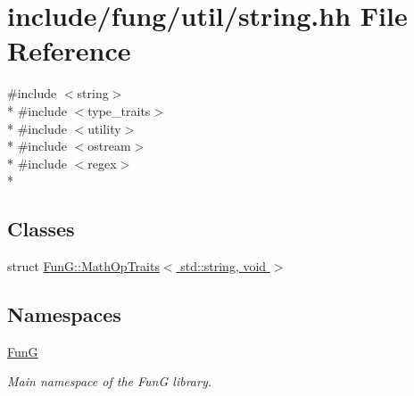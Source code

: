 \hypertarget{string_8hh}{\section{include/fung/util/string.hh File Reference}
\label{string_8hh}
}
{\ttfamily \#include $<$string$>$}\\*
{\ttfamily \#include $<$type\-\_\-traits$>$}\\*
{\ttfamily \#include $<$utility$>$}\\*
{\ttfamily \#include $<$ostream$>$}\\*
{\ttfamily \#include $<$regex$>$}\\*
\subsection*{Classes}
\begin{DoxyCompactItemize}
\item 
struct \hyperlink{structFunG_1_1MathOpTraits_3_01std_1_1string_00_01void_01_4}{Fun\-G\-::\-Math\-Op\-Traits$<$ std\-::string, void $>$}
\end{DoxyCompactItemize}
\subsection*{Namespaces}
\begin{DoxyCompactItemize}
\item 
\hyperlink{namespaceFunG}{Fun\-G}
\begin{DoxyCompactList}\small\item\em Main namespace of the Fun\-G library. \end{DoxyCompactList}\end{DoxyCompactItemize}
